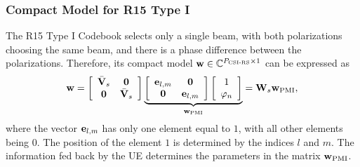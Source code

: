 \documentclass[lettersize,journal]{IEEEtran}
\begin{document}
\subsubsection{Compact Model for R15 Type I}
The R15 Type I Codebook selects only a single beam, with both polarizations choosing the same beam, and there is a phase difference between the polarizations. Therefore, its compact model $ {\bf{w}} \in \mathbb{C}^{{P_{{\text{CSI-RS}}}}\times 1}$ can be expressed as
\begin{equation}
 {\bf{w}} = \left[ {\begin{array}{*{20}{c}}
{{{\bar {\bf{V}} }_s}}&{\bf{0}}\\
{\bf{0}}&{{{\bar {\bf{V}} }_s}}
\end{array}} \right]\underbrace {\left[ {\begin{array}{*{20}{c}}
{{{\bf{e}}_{l,m}}}&{\bf{0}}\\
{\bf{0}}&{{{\bf{e}}_{l,m}}}
\end{array}} \right]\left[ {\begin{array}{*{20}{c}}
1\\
{{\varphi _n}}
\end{array}} \right]}_{{{\bf{w}}_{{\rm{PMI}}}}} = {{\bf{W}}_s}{{\bf{w}}_{{\rm{PMI}}}},   
\end{equation}
where the vector ${{\bf{e}}_{l,m}}$ has only one element equal to $1$, with all other elements being $0$. The position of the element $1$ is determined by the indices $l$ and $m$. The information fed back by the UE determines the parameters in the matrix ${{\bf{w}}_{{\rm{PMI}}}}$.
\end{document}
